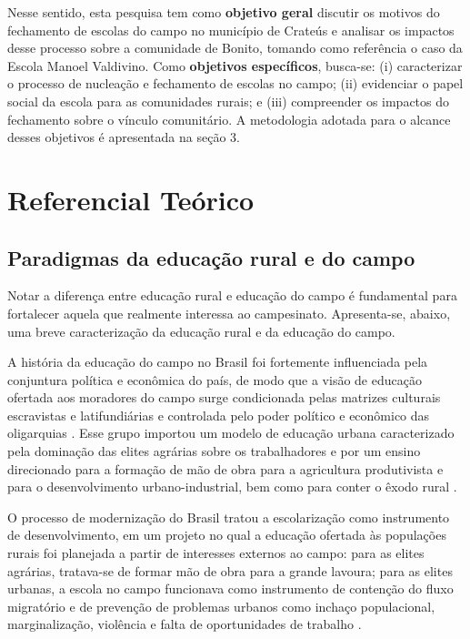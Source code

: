 \documentclass[
  12pt,
  openright,
  twoside,
  a4paper,
  english,
  brazilian,
  sumario=tradicional
]{abntex2}
\begin{document}
Nesse sentido, esta pesquisa tem como \textbf{objetivo geral} discutir os motivos do fechamento de escolas do campo no município de Crateús e analisar os impactos desse processo sobre a comunidade de Bonito, tomando como referência o caso da Escola Manoel Valdivino. Como \textbf{objetivos específicos}, busca-se: (i) caracterizar o processo de nucleação e fechamento de escolas no campo; (ii) evidenciar o papel social da escola para as comunidades rurais; e (iii) compreender os impactos do fechamento sobre o vínculo comunitário. A metodologia adotada para o alcance desses objetivos é apresentada na seção 3.

\section{Referencial Teórico}

\subsection{Paradigmas da educação rural e do campo}
Notar a diferença entre educação rural e educação do campo é fundamental para fortalecer aquela que realmente interessa ao campesinato. Apresenta-se, abaixo, uma breve caracterização da educação rural e da educação do campo.

A história da educação do campo no Brasil foi fortemente influenciada pela conjuntura política e econômica do país, de modo que a visão de educação ofertada aos moradores do campo surge condicionada pelas matrizes culturais escravistas e latifundiárias e controlada pelo poder político e econômico das oligarquias \cite{antunesrocha2014}. Esse grupo importou um modelo de educação urbana caracterizado pela dominação das elites agrárias sobre os trabalhadores e por um ensino direcionado para a formação de mão de obra para a agricultura produtivista e para o desenvolvimento urbano-industrial, bem como para conter o êxodo rural \cite{caldart2009}.

O processo de modernização do Brasil tratou a escolarização como instrumento de desenvolvimento, em um projeto no qual a educação ofertada às populações rurais foi planejada a partir de interesses externos ao campo: para as elites agrárias, tratava-se de formar mão de obra para a grande lavoura; para as elites urbanas, a escola no campo funcionava como instrumento de contenção do fluxo migratório e de prevenção de problemas urbanos como inchaço populacional, marginalização, violência e falta de oportunidades de trabalho \cite{caldart2009}.
\end{document}
